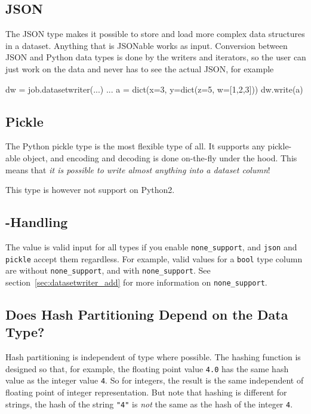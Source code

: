\subsection{JSON}
The JSON type makes it possible to store and load more complex data
structures in a dataset.  Anything that is JSONable works as input.
Conversion between JSON and Python data types is done by the writers
and iterators, so the user can just work on the data and never has to
see the actual JSON, for example
\begin{python}
dw = job.datasetwriter(...)
...
a = dict(x=3, y=dict(z=5, w=[1,2,3]))
dw.write(a)
\end{python}



\subsection{Pickle}
The Python pickle type is the most flexible type of all.  It supports
any pickle-able object, and encoding and decoding is done on-the-fly
under the hood.  This means that \textsl{it is possible to write almost
anything into a dataset column}!

This type is however not support on Python2.


\subsection{\pyNone-Handling}
The value \pyNone is valid input for all types if you enable
\texttt{none\_support}, and \texttt{json} and \texttt{pickle} accept
them regardless.
For example, valid values for a \texttt{bool} type column are
without \texttt{none\_support},
and 
with \texttt{none\_support}.
See section~\ref{sec:datasetwriter_add}
for more information on \texttt{none\_support}.



\subsection{Does Hash Partitioning Depend on the Data Type?}
Hash partitioning is independent of type where possible.  The hashing
function is designed so that, for example, the floating point
value \texttt{4.0} has the same hash value as the integer
value \texttt{4}.  So for integers, the result is the same independent
of floating point of integer representation.  But note that hashing is
different for strings, the hash of the string \texttt{"4"}
is \textsl{not} the same as the hash of the integer \texttt{4}.


